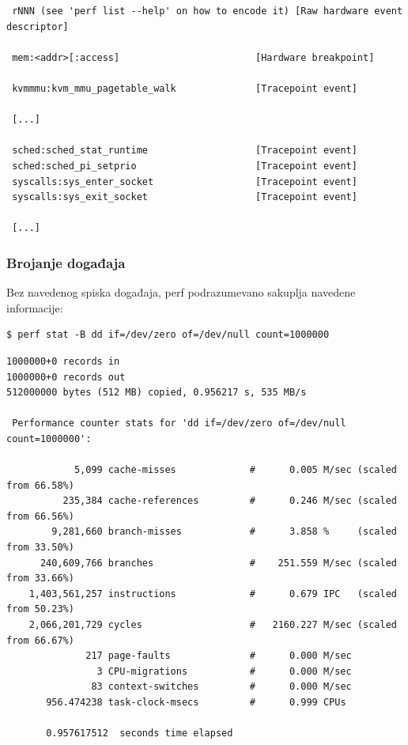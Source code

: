 \begin{verbatim}
 rNNN (see 'perf list --help' on how to encode it) [Raw hardware event descriptor]

 mem:<addr>[:access]                        [Hardware breakpoint]

 kvmmmu:kvm_mmu_pagetable_walk              [Tracepoint event]

 [...]

 sched:sched_stat_runtime                   [Tracepoint event]
 sched:sched_pi_setprio                     [Tracepoint event]
 syscalls:sys_enter_socket                  [Tracepoint event]
 syscalls:sys_exit_socket                   [Tracepoint event]

 [...]
\end{verbatim}

\subsubsection{Brojanje događaja}\label{brojanje-dogaux111aja}

Bez navedenog spiska događaja, perf podrazumevano sakuplja navedene informacije:

\begin{verbatim}
$ perf stat -B dd if=/dev/zero of=/dev/null count=1000000
\end{verbatim}

\begin{verbatim}
1000000+0 records in
1000000+0 records out
512000000 bytes (512 MB) copied, 0.956217 s, 535 MB/s

 Performance counter stats for 'dd if=/dev/zero of=/dev/null count=1000000':

            5,099 cache-misses             #      0.005 M/sec (scaled from 66.58%)
          235,384 cache-references         #      0.246 M/sec (scaled from 66.56%)
        9,281,660 branch-misses            #      3.858 %     (scaled from 33.50%)
      240,609,766 branches                 #    251.559 M/sec (scaled from 33.66%)
    1,403,561,257 instructions             #      0.679 IPC   (scaled from 50.23%)
    2,066,201,729 cycles                   #   2160.227 M/sec (scaled from 66.67%)
              217 page-faults              #      0.000 M/sec
                3 CPU-migrations           #      0.000 M/sec
               83 context-switches         #      0.000 M/sec
       956.474238 task-clock-msecs         #      0.999 CPUs

       0.957617512  seconds time elapsed
\end{verbatim}

